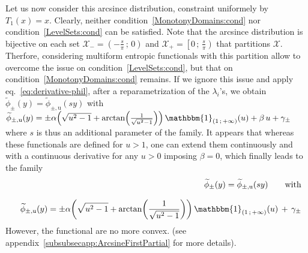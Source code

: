 \documentclass[entropy,article,submit,moreauthors,pdftex]{Definitions/mdpi}
\newcommand{\SZ}[1]{{\color{blue} #1}}                                       %
\def\X{\mathcal{X}}%
\def\un{\mathbbm{1}}%
\def\u{\mathrm{u}}
\begin{document}
\SZ{
\begin{Example}\label{arcsineUni:ex}
  Let  us now  consider  this arcsince  distribution,  constraint uniformely  by
  $T_1(x)  =  x$.   Clearly,  neither  condition~\ref{MonotonyDomains:cond}  nor
  condition~\ref{LevelSets:cond}  can  be  satisfied.  Note  that  the  arcsince
  distribution is bijective on each set $\X_- = \left( - \frac{s}{\pi} \, ; \, 0
  \right)$ and $\X_+  = \left[ 0 \, ; \,  \frac{s}{\pi} \right)$ that partitions
    $\X$.   Therfore,  considering  multiform  entropic  functionals  with  this
    partition allow to overcome the issue on condition~\ref{LevelSets:cond}, but
    that on condition~\ref{MonotonyDomains:cond} remains.
  If  we ignore  this issue  and apply  eq.~\eqref{eq:derivative-phil}, after  a
  reparametrization of  the $\lambda_i$'s, we obtain  $\widetilde{\phi}_\pm(y) =
  \widetilde{\phi}_{\pm,\u}(s  y)$  with   $\widetilde{\phi}_{\pm,\u}(y)  =  \pm
  \alpha \left( \sqrt{u^2 - 1}  + \arctan\left( \frac{1}{\sqrt{u^2 - 1}} \right)
  \right) \, \un_{( 1 \, ; \, +\infty )}(u) + \beta \, u + \gamma_\pm$ where $s$
  is thus an additional parameter of  the family.  It appears that whereas these
  functionals are defined for $u > 1$, one can extend them continuously and with
  a  continuous derivative  for any  $u  > 0$  imposing  $\beta =  0$,
  which finally leads to the family
  \begin{eqnarray*}
  &&\widetilde{\phi}_\pm(y) =  \widetilde{\phi}_{\pm,\u}(s y) \qquad \mbox{with}
  \\[2.5mm]
   && \widetilde{\phi}_{\pm,\u}(y) = \pm \alpha  \left( \sqrt{u^2 -
   1} + \arctan\left( \frac{1}{\sqrt{u^2 - 1}} \right)  \right)
  \, \un_{(  1 \, ;  \, +\infty )}(u) \, + \, \gamma_{\pm}
  \end{eqnarray*}
  However,     the     functional     are      no     more     convex.      (see
  appendix~\ref{subsubsecapp:ArcsineFirstPartial} for more details).
\end{Example}


}
\end{document}
